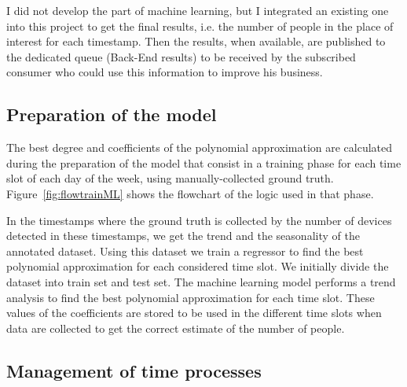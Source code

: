 I did not develop the part of machine learning, but I integrated an existing one into this project to get the final results, i.e. the number of people in the place of interest for each timestamp. Then the results, when available, are published to the dedicated queue (Back-End results) to be received by the subscribed consumer who could use this information to improve his business.


\vspace{0.1 cm}
\subsection{Preparation of the model}
\label{sec:model}
\vspace{0.1 cm} 

The best degree and coefficients of the polynomial approximation are calculated during the preparation of the model that consist in a training phase for each time slot of each day of the week, using manually-collected ground truth. Figure~\ref{fig:flowtrainML} shows the flowchart of the logic used in that phase.

In the timestamps where the ground truth is collected by the number of devices detected in these timestamps, we get the trend and the seasonality of the annotated dataset.
Using this dataset we train a regressor to find the best polynomial approximation for each considered time slot. We initially divide the dataset into train set and test set. The machine learning model performs a trend analysis to find the best polynomial approximation for each time slot. These values of the coefficients are stored to be used in the different time slots when data are collected to get the correct estimate of the number of people.


\vspace{0.1 cm}
\subsection{Management of time processes}
\label{sec:model}
\vspace{0.1 cm} 

